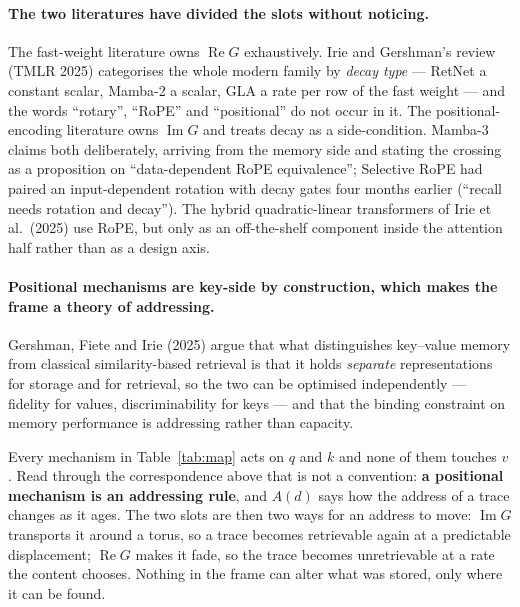 \documentclass[11pt]{article}
\begin{document}
\paragraph{The two literatures have divided the slots without noticing.} The
fast-weight literature owns $\operatorname{Re}G$ exhaustively. Irie and Gershman's
review (TMLR 2025) categorises the whole modern family by \emph{decay type} ---
RetNet a constant scalar, Mamba-2 a scalar, GLA a rate per row of the fast weight
--- and the words ``rotary'', ``RoPE'' and ``positional'' do not occur in it. The
positional-encoding literature owns $\operatorname{Im}G$ and treats decay as a
side-condition. Mamba-3 claims both deliberately, arriving from the memory side and
stating the crossing as a proposition on ``data-dependent RoPE equivalence''; Selective
RoPE had paired an input-dependent rotation with decay gates four months earlier
(``recall needs rotation and decay''). The hybrid quadratic-linear transformers of
Irie et al.\ (2025) use RoPE, but only as an off-the-shelf component inside the
attention half rather than as a design axis.

\paragraph{Positional mechanisms are key-side by construction, which makes the frame
a theory of addressing.} Gershman, Fiete and Irie (2025) argue that what
distinguishes key--value memory from classical similarity-based retrieval is that it
holds \emph{separate} representations for storage and for retrieval, so the two can
be optimised independently --- fidelity for values, discriminability for keys --- and
that the binding constraint on memory performance is addressing rather than capacity.

Every mechanism in Table~\ref{tab:map} acts on $q$ and $k$ and none of them touches $v$. Read
through the correspondence above that is not a convention: \textbf{a positional
mechanism is an addressing rule}, and $A(d)$ says how the address of a trace changes
as it ages. The two slots are then two ways for an address to move:
$\operatorname{Im}G$ transports it around a torus, so a trace becomes retrievable
again at a predictable displacement; $\operatorname{Re}G$ makes it fade, so the trace
becomes unretrievable at a rate the content chooses. Nothing in the frame can alter
what was stored, only where it can be found.
\end{document}
